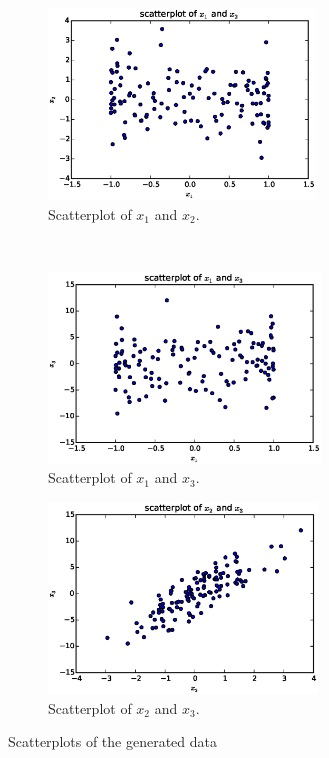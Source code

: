 \documentclass[a4paper,12pt]{article}
\begin{document}
\begin{figure}[t!]
    \centering
    \begin{subfigure}[t]{0.5\textwidth}
        \centering
        \includegraphics[height=2in]{figures/e2_scatter_x12.eps}
        \caption{Scatterplot of $x_1$ and $x_2$.}
    \end{subfigure}%
    ~  %
    \begin{subfigure}[t]{0.5\textwidth}
        \centering
        \includegraphics[height=2in]{figures/e2_scatter_x13.eps}
        \caption{Scatterplot of $x_1$ and $x_3$.}
    \end{subfigure}%
     
    \begin{subfigure}[t]{0.5\textwidth}
        \centering
        \includegraphics[height=2in]{figures/e2_scatter_x23.eps}
        \caption{Scatterplot of $x_2$ and $x_3$.}
    \end{subfigure}    
    \caption{Scatterplots of the generated data}
    \label{fig:scatter}
\end{figure}
\end{document}
